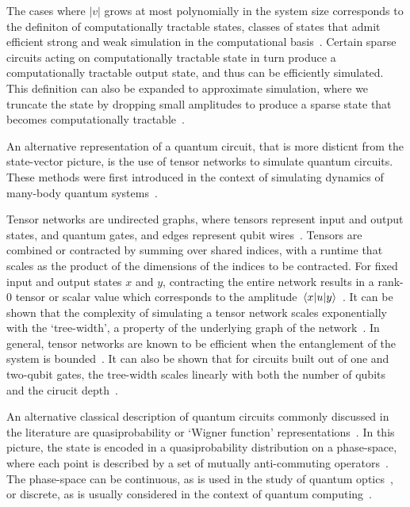 The cases where $\left|v\right|$ grows at most polynomially in the system size corresponds to the definiton of computationally tractable states, classes of states that admit efficient strong and weak simulation in the computational basis~\cite{VandenNest2009}. Certain sparse circuits acting on computationally tractable state in turn produce a computationally tractable output state, and thus can be efficiently simulated. This definition can also be expanded to approximate simulation, where we truncate the state by dropping small amplitudes to produce a sparse state that becomes computationally tractable~\cite{Schwarz2013}.\par
An alternative representation of a quantum circuit, that is more disticnt from the state-vector picture, is the use of tensor networks to simulate quantum circuits. These methods were first introduced in the context of simulating dynamics of many-body quantum systems~\cite{Vidal2003}.\par
Tensor networks are undirected graphs, where tensors represent input and output states, and quantum gates, and edges represent qubit wires~\cite{Markov2005}. Tensors are combined or contracted by summing over shared indices, with a runtime that scales as the product of the dimensions of the indices to be contracted. For fixed input and output states $x$ and $y$, contracting the entire network results in a rank-0 tensor or scalar value which corresponds to the amplitude $\matrixel{x}{u}{y}$~\cite{Markov2005}. It can be shown that the complexity of simulating a tensor network scales exponentially with the `tree-width', a property of the underlying graph of the network~\cite{Markov2005}. In general, tensor networks are known to be efficient when the entanglement of the system is bounded~\cite{Vidal2003}. It can also be shown that for circuits built out of one and two-qubit gates, the tree-width scales linearly with both the number of qubits and the cirucit depth~\cite{Markov2005}.\par
An alternative classical description of quantum circuits commonly discussed in the literature are quasiprobability or `Wigner function' representations~\cite{Wootters1987}. In this picture, the state is encoded in a quasiprobability distribution on a phase-space, where each point is described by a set of mutually anti-commuting operators~\cite{Wootters1987}. The phase-space can be continuous, as is used in the study of quantum optics~\cite{Nielsen2000}, or discrete, as is usually considered in the context of quantum computing~\cite{Gross2006}.\par
